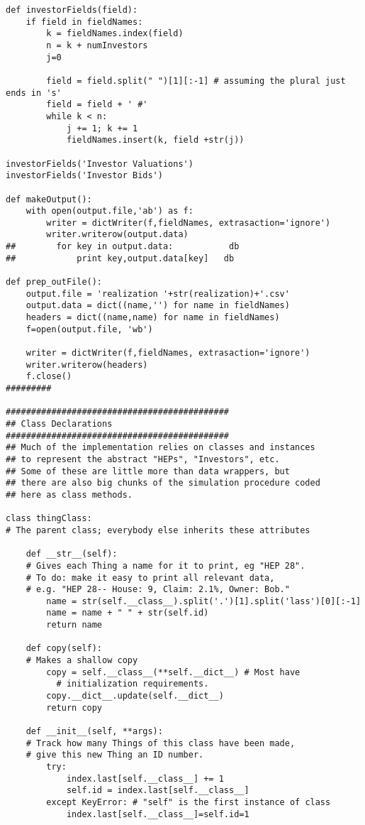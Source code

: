 \begin{lstlisting}
def investorFields(field):
    if field in fieldNames:
        k = fieldNames.index(field)
        n = k + numInvestors
        j=0
        
        field = field.split(" ")[1][:-1] # assuming the plural just ends in 's'
        field = field + ' #'
        while k < n:
            j += 1; k += 1
            fieldNames.insert(k, field +str(j))

investorFields('Investor Valuations')
investorFields('Investor Bids')    

def makeOutput():
    with open(output.file,'ab') as f:
        writer = dictWriter(f,fieldNames, extrasaction='ignore')
        writer.writerow(output.data)
##        for key in output.data:           db
##            print key,output.data[key]   db

def prep_outFile():
    output.file = 'realization '+str(realization)+'.csv'
    output.data = dict((name,'') for name in fieldNames)
    headers = dict((name,name) for name in fieldNames)
    f=open(output.file, 'wb')
    
    writer = dictWriter(f,fieldNames, extrasaction='ignore')
    writer.writerow(headers)
    f.close()
#########
        
############################################
## Class Declarations
############################################
## Much of the implementation relies on classes and instances
## to represent the abstract "HEPs", "Investors", etc.
## Some of these are little more than data wrappers, but
## there are also big chunks of the simulation procedure coded 
## here as class methods.

class thingClass:
# The parent class; everybody else inherits these attributes
    
    def __str__(self):
    # Gives each Thing a name for it to print, eg "HEP 28".
    # To do: make it easy to print all relevant data,
    # e.g. "HEP 28-- House: 9, Claim: 2.1%, Owner: Bob."
        name = str(self.__class__).split('.')[1].split('lass')[0][:-1]
        name = name + " " + str(self.id)
        return name

    def copy(self):
    # Makes a shallow copy 
        copy = self.__class__(**self.__dict__) # Most have
          # initialization requirements.
        copy.__dict__.update(self.__dict__)
        return copy

    def __init__(self, **args):
    # Track how many Things of this class have been made,
    # give this new Thing an ID number.
        try:
            index.last[self.__class__] += 1
            self.id = index.last[self.__class__]
        except KeyError: # "self" is the first instance of class
            index.last[self.__class__]=self.id=1



\end{lstlisting}
